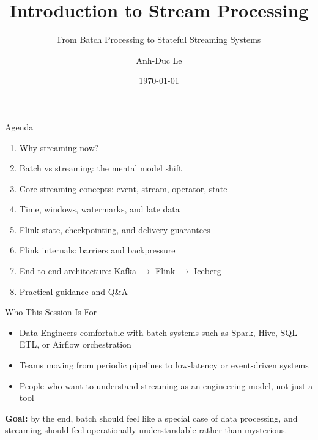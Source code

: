 \documentclass[aspectratio=169]{beamer}
\title{Introduction to Stream Processing}
\subtitle{From Batch Processing to Stateful Streaming Systems}
\author{Anh-Duc Le}
\date{\today}
\begin{document}
\frame{\titlepage}

\begin{frame}{Agenda}
\begin{enumerate}
    \item Why streaming now?
    \item Batch vs streaming: the mental model shift
    \item Core streaming concepts: event, stream, operator, state
    \item Time, windows, watermarks, and late data
    \item Flink state, checkpointing, and delivery guarantees
    \item Flink internals: barriers and backpressure
    \item End-to-end architecture: Kafka $\rightarrow$ Flink $\rightarrow$ Iceberg
    \item Practical guidance and Q\&A
\end{enumerate}
\end{frame}

\begin{frame}{Who This Session Is For}
\begin{itemize}
    \item Data Engineers comfortable with batch systems such as Spark, Hive, SQL ETL, or Airflow orchestration
    \item Teams moving from periodic pipelines to low-latency or event-driven systems
    \item People who want to understand streaming as an engineering model, not just a tool
\end{itemize}

\vspace{0.4cm}
\textbf{Goal:} by the end, batch should feel like a special case of data processing, and streaming should feel operationally understandable rather than mysterious.
\end{frame}
\end{document}
